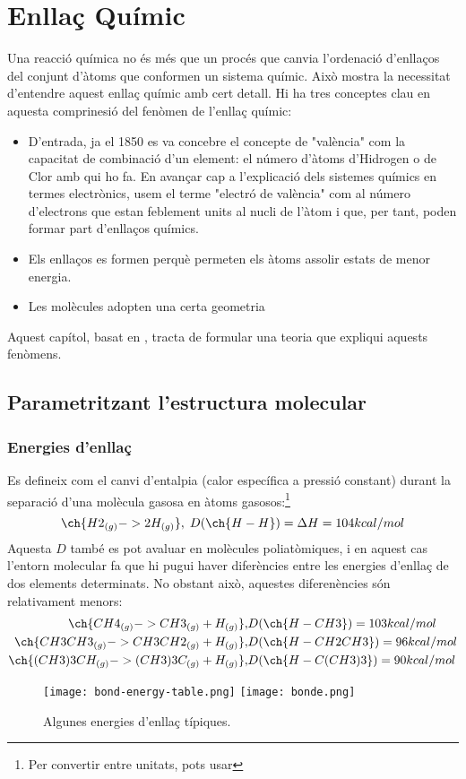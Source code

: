 \chapter{Enllaç Químic}

Una reacció química no és més que un procés que canvia l'ordenació d'enllaços del conjunt d'àtoms que conformen un sistema químic.
Això mostra la necessitat d'entendre aquest enllaç químic amb cert detall.
Hi ha tres conceptes clau en aquesta comprinesió del fenòmen de l'enllaç químic:
\begin{itemize}
\item D'entrada, ja el 1850 es va concebre el concepte de "valència" com la capacitat de combinació d'un element: el número d'àtoms d'Hidrogen o de Clor amb qui ho fa. 
En avançar cap a l'explicació dels sistemes químics en termes electrònics, usem el terme "electró de valència" com al número d'electrons que estan feblement units al nucli de l'àtom i que, per tant, poden formar part d'enllaços químics.
\item Els enllaços es formen perquè permeten els àtoms assolir estats de menor energia.
\item Les molècules adopten una certa geometria
\end{itemize}

Aquest capítol, basat en \cite{mahan_quimico_1977}, tracta de formular una teoria que expliqui aquests fenòmens.

\section{Parametritzant l'estructura molecular}

\subsection{Energies d'enllaç}

Es defineix com el canvi d'entalpia (calor específica a pressió constant) durant la separació d'una molècula gasosa en àtoms gasosos:\footnote{Per convertir entre unitats, pots usar }
\[
\ch{H2_{(g)} -> 2 H_{(g)}}, \; D(\ch{H-H})=\Delta H = 104 kcal/mol
\]
Aquesta $D$ també es pot avaluar en molècules poliatòmiques, i en aquest cas l'entorn molecular fa que hi pugui haver diferències entre les energies d'enllaç de dos elements determinats. No obstant això, aquestes diferenències són relativament menors:
\begin{eqnarray}
\ch{CH4_{(g)} -> CH3_{(g)} + H_{(g)}}, & D(\ch{H-CH3})=103 kcal/mol\\
\ch{CH3CH3_{(g)} -> CH3CH2_{(g)} + H_{(g)}}, & D(\ch{H-CH2CH3})=96 kcal/mol\\
\ch{(CH3)3CH_{(g)} -> (CH3)3C_{(g)}+H_{(g)}}, & D(\ch{H-C(CH3)3})=90 kcal/mol
\end{eqnarray}
\begin{figure}[h]
\centering
\texttt{[image: bond-energy-table.png]}
\texttt{[image: bonde.png]}
\caption{Algunes energies d'enllaç típiques.}
\label{fig:bond-energy-table}
\end{figure}

